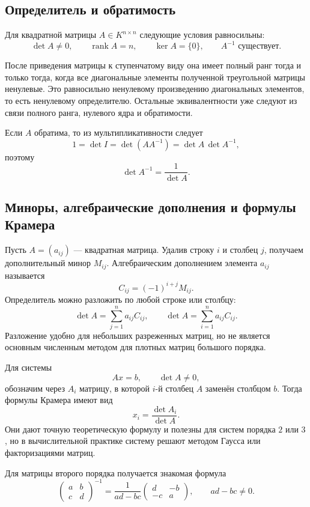 \subsection{Определитель и обратимость}

\begin{theorem}
Для квадратной матрицы \(A\in K^{n\times n}\) следующие условия равносильны:
\[
\det A\neq 0,
\qquad
\operatorname{rank}A=n,
\qquad
\ker A=\{0\},
\qquad
A^{-1}\text{ существует}.
\]
\end{theorem}

\begin{proofidea}
После приведения матрицы к ступенчатому виду она имеет полный ранг тогда и только тогда, когда все диагональные элементы полученной треугольной матрицы ненулевые. Это равносильно ненулевому произведению диагональных элементов, то есть ненулевому определителю. Остальные эквивалентности уже следуют из связи полного ранга, нулевого ядра и обратимости.
\end{proofidea}

Если \(A\) обратима, то из мультипликативности следует
\[
1=\det I=\det(AA^{-1})=\det A\,\det A^{-1},
\]
поэтому
\[
\det A^{-1}=\frac{1}{\det A}.
\]

\subsection{Миноры, алгебраические дополнения и формулы Крамера}

Пусть \(A=(a_{ij})\) --- квадратная матрица. Удалив строку \(i\) и столбец \(j\), получаем дополнительный минор \(M_{ij}\). Алгебраическим дополнением элемента \(a_{ij}\) называется
\[
C_{ij}=(-1)^{i+j}M_{ij}.
\]
Определитель можно разложить по любой строке или столбцу:
\[
\det A=\sum_{j=1}^{n}a_{ij}C_{ij},
\qquad
\det A=\sum_{i=1}^{n}a_{ij}C_{ij}.
\]
Разложение удобно для небольших разреженных матриц, но не является основным численным методом для плотных матриц большого порядка.

Для системы
\[
Ax=b,
\qquad
\det A\neq 0,
\]
обозначим через \(A_i\) матрицу, в которой \(i\)-й столбец \(A\) заменён столбцом \(b\). Тогда формулы Крамера имеют вид
\[
x_i=\frac{\det A_i}{\det A}.
\]
Они дают точную теоретическую формулу и полезны для систем порядка \(2\) или \(3\), но в вычислительной практике систему решают методом Гаусса или факторизациями матриц.

Для матрицы второго порядка получается знакомая формула
\[
\begin{pmatrix}a&b\\c&d\end{pmatrix}^{-1}
=
\frac{1}{ad-bc}
\begin{pmatrix}d&-b\\-c&a\end{pmatrix},
\qquad
ad-bc\neq 0.
\]

